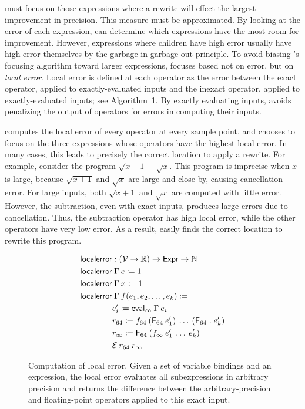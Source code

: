 \documentclass[paper.tex]{subfiles}
\begin{document}
\casio must focus on those expressions
  where a rewrite will effect the largest improvement in precision.
This measure must be approximated.
By looking at the error of each expression,
  \casio can determine which expressions
  have the most room for improvement.
However, expressions where children have high error
  usually have high error themselves by
  the garbage-in garbage-out principle.
To avoid biasing \casio's focusing algorithm
  toward larger expressions, \casio focuses
  based not on error, but on \emph{local error}.
Local error is defined at each operator
  as the error between
  the exact operator, applied to exactly-evaluated inputs
  and the inexact operator, applied to exactly-evaluated inputs;
  see Algorithm~\ref{alg:focus}.
By exactly evaluating inputs,
  \casio avoids penalizing the output of operators
  for errors in computing their inputs.

\casio computes the local error of every operator at every sample point,
  and chooses to focus on the three expressions
  whose operators have the highest local error.
In many cases, this leads \casio to precisely the correct location
  to apply a rewrite.
For example, consider the program $\sqrt{x+1} - \sqrt{x}$.
This program is imprecise when $x$ is large,
  because $\sqrt{x+1}$ and $\sqrt{x}$ are large and close-by,
  causing cancellation error.
For large inputs, both $\sqrt{x+1}$ and $\sqrt{x}$
  are computed with little error.
However, the subtraction, even with exact inputs,
  produces large errors due to cancellation.
Thus, the subtraction operator has high local error,
  while the other operators have very low error.
As a result, \casio easily finds the correct location
  to rewrite this program.

\begin{figure}
\begin{align*}
  \|localerror| &: (\Var \to \RR) \to \Expr \to \NN \\
  \|localerror| &\:\Gamma\:c \ceq 1 \\
  \|localerror| &\:\Gamma\:x \ceq 1 \\
  \|localerror| &\:\Gamma\:f(e_1, e_2, \ldots, e_k) \ceq \\
  & e_i' \ceq \|eval|_\infty\:\Gamma\:e_i \\
  & r_{64} \ceq f_{64}\:(\F_{64}\:e_1')\:\ldots\:(\F_{64}:e_k') \\
  & r_\infty \ceq \F_{64}\:(f_\infty\:e_1'\:\ldots\:e_k') \\
  & \Err\:r_{64}\:r_\infty \\
\end{align*}
\caption{Computation of local error.
  Given a set of variable bindings and an expression,
  the local error evaluates all subexpressions in arbitrary precision and returns
  the difference between the arbitrary-precision and floating-point operators
  applied to this exact input.}
\label{alg:focus}
\end{figure}
\end{document}
